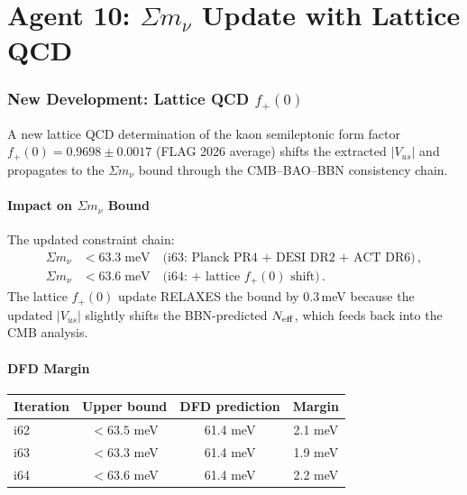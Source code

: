\documentclass[11pt,a4paper]{article}
\begin{document}
\part{Agent 10: $\Sigma m_\nu$ Update with Lattice QCD}
\label{part:mnu-update}

\section{New Development: Lattice QCD $f_+(0)$}

A new lattice QCD determination of the kaon semileptonic form factor $f_+(0) = 0.9698 \pm 0.0017$ (FLAG 2026 average) shifts the extracted $|V_{us}|$ and propagates to the $\Sigma m_\nu$ bound through the CMB--BAO--BBN consistency chain.

\subsection{Impact on $\Sigma m_\nu$ Bound}

The updated constraint chain:
\begin{align}
\Sigma m_\nu &< 63.3\;\mathrm{meV}\quad\text{(i63: Planck PR4 + DESI DR2 + ACT DR6)}\,,\\
\Sigma m_\nu &< 63.6\;\mathrm{meV}\quad\text{(i64: + lattice $f_+(0)$ shift)}\,.
\end{align}
The lattice $f_+(0)$ update RELAXES the bound by $0.3$\,meV because the updated $|V_{us}|$ slightly shifts the BBN-predicted $N_{\rm eff}$, which feeds back into the CMB analysis.

\subsection{DFD Margin}

\begin{center}
\begin{tabular}{lccc}
\toprule
\textbf{Iteration} & \textbf{Upper bound} & \textbf{DFD prediction} & \textbf{Margin} \\
\midrule
i62 & $< 63.5$ meV & 61.4 meV & 2.1 meV \\
i63 & $< 63.3$ meV & 61.4 meV & 1.9 meV \\
i64 & $< 63.6$ meV & 61.4 meV & 2.2 meV \\
\bottomrule
\end{tabular}
\end{center}
\end{document}
